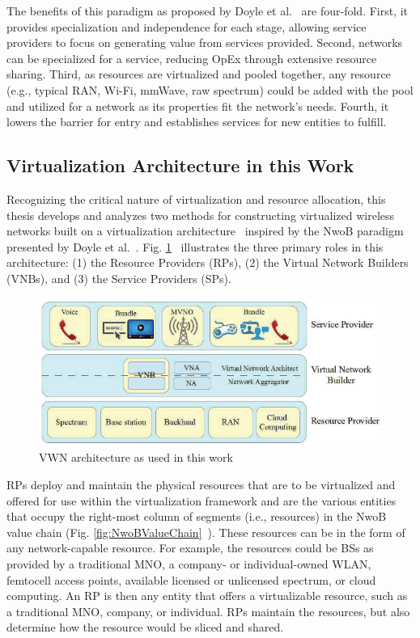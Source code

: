 \documentclass[12pt,dvipsnames]{report}
\begin{document}
The benefits of this paradigm as proposed by Doyle et al.~\cite{6737248} are four-fold.  First, it provides specialization and independence for each stage, allowing service providers to focus on generating value from services provided.  Second, networks can be specialized for a service, reducing OpEx through extensive resource sharing.  Third, as resources are virtualized and pooled together, any resource (e.g., typical RAN, Wi-Fi, mmWave, raw spectrum) could be added with the pool and utilized for a network as its properties fit the network's needs.  Fourth, it lowers the barrier for entry and establishes services for new entities to fulfill.

\subsection{Virtualization Architecture in this Work} \label{subsec:virtualization_architecture}

Recognizing the critical nature of virtualization and resource allocation, this thesis develops and analyzes two methods for constructing virtualized wireless networks built on a virtualization architecture~\cite{MJ_CCNC_16, MJ_MECOMM_17} inspired by the NwoB paradigm presented by Doyle et al.~\cite{6737248}.  Fig. \ref{fig:VWNArchitecture}~\cite{MJ_CCNC_16, MJ_MECOMM_17} illustrates the three primary roles in this architecture: (1) the Resource Providers (RPs), (2) the Virtual Network Builders (VNBs), and (3) the Service Providers (SPs).

\begin{figure}
	\centering
	\includegraphics[width=\linewidth]{VWNArchitecture}
	\caption[VWN architecture as used in this work]{\small VWN architecture as used in this work~\cite{MJ_CCNC_16, MJ_MECOMM_17}}
	\label{fig:VWNArchitecture}
\end{figure}

RPs deploy and maintain the physical resources that are to be virtualized and offered for use within the virtualization framework and are the various entities that occupy the right-most column of segments (i.e., resources) in the NwoB value chain (Fig. \ref{fig:NwoBValueChain}~\cite{6737248}).  These resources can be in the form of any network-capable resource.  For example, the resources could be BSs as provided by a traditional MNO, a company- or individual-owned WLAN, femtocell access points, available licensed or unlicensed spectrum, or cloud computing.  An RP is then any entity that offers a virtualizable resource, such as a traditional MNO, company, or individual.  RPs maintain the resources, but also determine how the resource would be sliced and shared.
\end{document}
